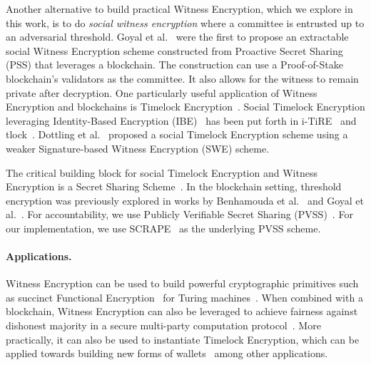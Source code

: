 Another alternative to build practical Witness Encryption, which we explore in this work, is to do \emph{social witness encryption} where a committee is entrusted up to an adversarial threshold.
Goyal et al.~\cite{eweb} were the first to propose an extractable social Witness Encryption scheme constructed from Proactive Secret Sharing (PSS) that leverages a blockchain.
The construction can use a Proof-of-Stake blockchain's validators as the committee.
It also allows for the witness to remain private after decryption.
One particularly useful application of Witness Encryption and blockchains is Timelock Encryption~\cite{timelock_puzzles,timelock_from_crc,timed_release_cryptography}.
Social Timelock Encryption leveraging Identity-Based Encryption (IBE)~\cite{ibe} has been put forth in i-TiRE~\cite{i-TiRE} and tlock~\cite{tlock}.
Dottling et al.~\cite{mcfly} proposed a social Timelock Encryption scheme using a weaker Signature-based Witness Encryption (SWE) scheme.

The critical building block for social Timelock Encryption and Witness Encryption is a Secret Sharing Scheme~\cite{shamir_ss}. In the blockchain setting, threshold encryption was previously explored in works by Benhamouda et al.~\cite{benhamouda_ecpss} and Goyal et al.~\cite{eweb}.
For accountability, we use Publicly Verifiable Secret Sharing (PVSS)~\cite{first_pvss_chor,pvss_stadler}.
For our implementation, we use SCRAPE~\cite{pvss_scrape} as the underlying PVSS scheme.

\paragraph{Applications.}
Witness Encryption can be used to build powerful cryptographic primitives such as succinct Functional Encryption~\cite{functional_encryption,fe_survey_review} for Turing machines~\cite{turing_machine_fe}.
When combined with a blockchain, Witness Encryption can also be leveraged to achieve fairness against dishonest majority in a secure multi-party computation protocol~\cite{we_mpc_fairness}.
More practically, it can also be used to instantiate Timelock Encryption, which can be applied towards building new forms of wallets~\cite{horus} among other applications.